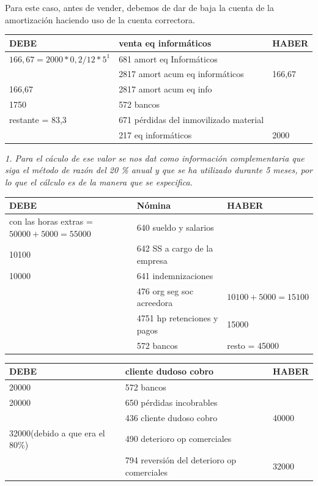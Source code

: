 \documentclass[a4paper,12pt]{article}
\begin{document}
Para este caso, antes de vender, debemos de dar de baja la cuenta de la amortización haciendo uso de la cuenta correctora.
\begin{table}[H]
    \centering
    \begin{tabular}{|p{3cm}|p{6cm}|p{3cm}|}
    \hline
    \textbf{DEBE} & \textbf{venta eq informáticos} & \textbf{HABER} \\
    \hline
    $166,67 = 2000 * 0,2 / 12 * 5 ^1$& 681 amort eq Informáticos & \\
    \hline
    & 2817 amort acum eq informáticos & 166,67\\
    \hline
    166,67 & 2817 amort acum eq info& \\
    \hline
    1750 & 572 bancos & \\
    \hline
    restante = 83,3& 671 pérdidas del inmovilizado material& \\
    \hline
    & 217 eq informáticos & 2000 \\
    \hline
    \end{tabular}
\end{table}

\textit{1. Para el cáculo de ese valor se nos dat como información complementaria que siga el método de razón del 20 \% anual y que se ha utilizado durante 5 meses, por lo que el cálculo es de la manera que se especifica.}

\begin{table}[H]
    \centering
    \begin{tabular}{|p{3cm}|p{6cm}|p{3cm}|}
    \hline
    \textbf{DEBE} & \textbf{Nómina} & \textbf{HABER} \\
    \hline
    con las horas extras = $50000+5000 = 55000$& 640 sueldo y salarios& \\
    \hline
    10100& 642 SS a cargo de la empresa & \\
    \hline
    10000& 641 indemnizaciones& \\
    \hline
    & 476 org seg soc acreedora & $10100 + 5000 = 15100$\\
    \hline
    & 4751 hp retenciones y pagos & 15000 \\
    \hline
    &572 bancos & resto = 45000\\
    \hline
    \end{tabular}
\end{table}

\begin{table}[H]
    \centering
    \begin{tabular}{|p{3cm}|p{6cm}|p{3cm}|}
    \hline
    \textbf{DEBE} & \textbf{cliente dudoso cobro} & \textbf{HABER} \\
    \hline
    20000& 572 bancos & \\
    \hline
    20000& 650 pérdidas incobrables& \\
    \hline
    & 436 cliente dudoso cobro & 40000\\
    \hline
    32000(debido a que era el 80\%)& 490 deterioro op comerciales & \\
    \hline
    & 794 reversión del deterioro op comerciales& 32000\\
    \hline
    \end{tabular}
\end{table}
\end{document}
